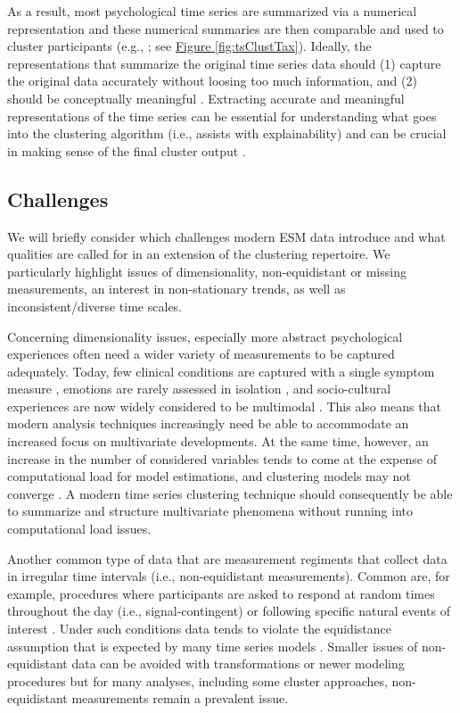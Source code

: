 \documentclass[man, 12pt, a4paper, mask, floatsintext]{apa7}
\theoremstyle{break}
\theoremstyle{plain}
\newcommand{\fgrref}[2][]{\hyperref[#2]{Figure \ref*{#2}#1}}
\begin{document}
As a result, most psychological time series are summarized via a numerical representation and these numerical summaries are then comparable and used to cluster participants (e.g., \citealp[]{timmerman2013}; see \fgrref{fig:tsClustTax}). Ideally, the representations that summarize the original time series data should (1) capture the original data accurately without loosing too much information, and (2) should be conceptually meaningful \citep[][]{vandermaaten2009}. Extracting accurate and meaningful representations of the time series can be essential for understanding what goes into the clustering algorithm (i.e., assists with explainability) and can be crucial in making sense of the final cluster output \citep[i.e., assists with interpretability; e.g.,][]{Kennedy2021}. 

\subsection{Challenges}

We will briefly consider which challenges modern ESM data introduce and what qualities are called for in an extension of the clustering repertoire. We particularly highlight issues of dimensionality, non-equidistant or missing measurements, an interest in non-stationary trends, as well as inconsistent/diverse time scales. 

Concerning dimensionality issues, especially more abstract psychological experiences often need a wider variety of measurements to be captured adequately. Today, few clinical conditions are captured with a single symptom measure \citep[e.g.,][]{cramer2016}, emotions are rarely assessed in isolation \citep[e.g.,][]{reitsema2022}, and socio-cultural experiences are now widely considered to be multimodal \citep[e.g.,][]{Kreienkamp2022d}. This also means that modern analysis techniques increasingly need be able to accommodate an increased focus on multivariate developments. At the same time, however, an increase in the number of considered variables tends to come at the expense of computational load for model estimations, and clustering models may not converge \citep[the aforementioned dimensionality curse;][]{altman2018}. A modern time series clustering technique should consequently be able to summarize and structure multivariate phenomena without running into computational load issues.

Another common type of data that are measurement regiments that collect data in irregular time intervals (i.e., non-equidistant measurements). Common are, for example, procedures where participants are asked to respond at random times throughout the day (i.e., signal-contingent) or following specific natural events of interest \citep[i.e., event-contingent; see][]{shiffman2008, myin-germeys2018}. Under such conditions data tends to violate the equidistance assumption that is expected by many time series models \citep[][]{hamaker2017}. Smaller issues of non-equidistant data can be avoided with transformations \citep[e.g., dynamic time warping,][]{berndt1994} or newer modeling procedures \citep[e.g., continuous-time models;][]{dehaan-rietdijk2017} but for many analyses, including some cluster approaches, non-equidistant measurements remain a prevalent issue. 
\end{document}
